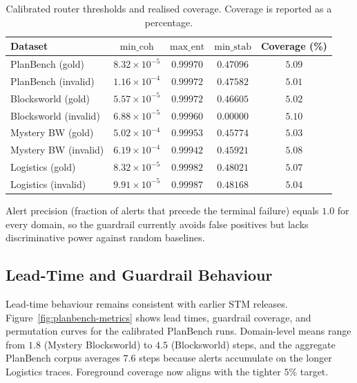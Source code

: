 \documentclass[11pt]{article}
\begin{document}
\begin{table}[h]
  \centering
  \caption{Calibrated router thresholds and realised coverage. Coverage is reported as a percentage.}
  \label{tab:coverage}
  \begin{tabular}{lcccc}
    \toprule
    Dataset & $\text{min\_coh}$ & $\text{max\_ent}$ & $\text{min\_stab}$ & Coverage (\%) \\
    \midrule
    PlanBench (gold) & $8.32\times10^{-5}$ & $0.99970$ & $0.47096$ & $5.09$ \\
    PlanBench (invalid) & $1.16\times10^{-4}$ & $0.99972$ & $0.47582$ & $5.01$ \\
    Blocksworld (gold) & $5.57\times10^{-5}$ & $0.99972$ & $0.46605$ & $5.02$ \\
    Blocksworld (invalid) & $6.88\times10^{-5}$ & $0.99960$ & $0.00000$ & $5.10$ \\
    Mystery BW (gold) & $5.02\times10^{-4}$ & $0.99953$ & $0.45774$ & $5.03$ \\
    Mystery BW (invalid) & $6.19\times10^{-4}$ & $0.99942$ & $0.45921$ & $5.08$ \\
    Logistics (gold) & $8.32\times10^{-5}$ & $0.99982$ & $0.48021$ & $5.07$ \\
    Logistics (invalid) & $9.91\times10^{-5}$ & $0.99987$ & $0.48168$ & $5.04$ \\
    \bottomrule
  \end{tabular}
\end{table}
Alert precision (fraction of alerts that precede the terminal failure) equals $1.0$ for every domain, so the guardrail currently avoids false positives but lacks discriminative power against random baselines.


\subsection{Lead-Time and Guardrail Behaviour}
Lead-time behaviour remains consistent with earlier STM releases. Figure~\ref{fig:planbench-metrics}
shows lead times, guardrail coverage, and permutation curves for the calibrated
PlanBench runs. Domain-level means range from $1.8$ (Mystery Blocksworld) to
$4.5$ (Blocksworld) steps, and the aggregate PlanBench corpus averages $7.6$
steps because alerts accumulate on the longer Logistics traces. Foreground
coverage now aligns with the tighter $5\%$ target.
\end{document}
